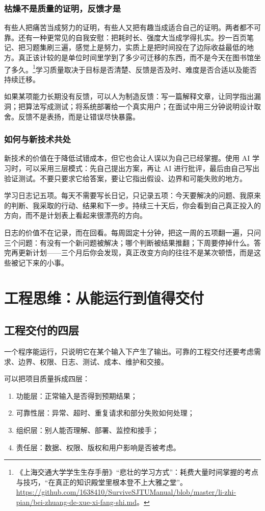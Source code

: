 \documentclass[UTF8,zihao=5,openany]{ctexbook}
\begin{document}
\subsection{枯燥不是质量的证明，反馈才是}
有些人把痛苦当成努力的证明，有些人又把有趣当成适合自己的证明。两者都不可靠。还有一种更常见的自我安慰：把耗时长、强度大当成学得扎实。抄一百页笔记、把习题集刷三遍，感觉上是努力，实质上是把时间投在了边际收益最低的地方。真正该计较的是单位时间里学到了多少可迁移的东西，而不是今天在图书馆坐了多久。\footnote{《上海交通大学学生生存手册》“悲壮的学习方式”：耗费大量时间掌握的考点与技巧，“在真正的知识殿堂里根本登不上大雅之堂”。\url{https://github.com/1638410/SurviveSJTUManual/blob/master/li-zhi-pian/bei-zhuang-de-xue-xi-fang-shi.md}。}学习质量取决于目标是否清楚、反馈是否及时、难度是否合适以及能否持续迁移。

如果某项能力长期没有反馈，可以人为制造反馈：写一篇解释文章，让同学指出漏洞；把算法写成测试；将系统部署给一个真实用户；在面试中用三分钟说明设计取舍。反馈不是表扬，而是让错误尽快暴露。

\subsection{如何与新技术共处}
新技术的价值在于降低试错成本，但它也会让人误以为自己已经掌握。使用 AI 学习时，可以采用三层模式：先自己提出方案，再让 AI 进行批评，最后由自己写出验证测试。不要只要求它给答案，要让它指出假设、边界和可能失败的地方。

学习日志记五项。每天不需要写长日记，只记录五项：今天要解决的问题、我原来的判断、我采取的行动、结果和下一步。持续三十天后，你会看到自己真正投入的方向，而不是计划表上看起来很漂亮的方向。

日志的价值不在记录，而在回看。每周固定十分钟，把这一周的五项翻一遍，只问三个问题：有没有一个新问题被解决；哪个判断被结果推翻；下周要停掉什么。答完再更新计划——三个月后你会发现，真正改变方向的往往不是某次顿悟，而是这些被记下来的小事。

\chapter{工程思维：从能运行到值得交付}
\section{工程交付的四层}
一个程序能运行，只说明它在某个输入下产生了输出。可靠的工程交付还要考虑需求、边界、权限、日志、测试、成本、维护和交接。

可以把项目质量拆成四层：
\begin{enumerate}
\item 功能层：正常输入是否得到预期结果；
\item 可靠性层：异常、超时、重复请求和部分失败如何处理；
\item 组织层：别人能否理解、部署、监控和接手；
\item 责任层：数据、权限、版权和用户影响是否被考虑。
\end{enumerate}
\end{document}

